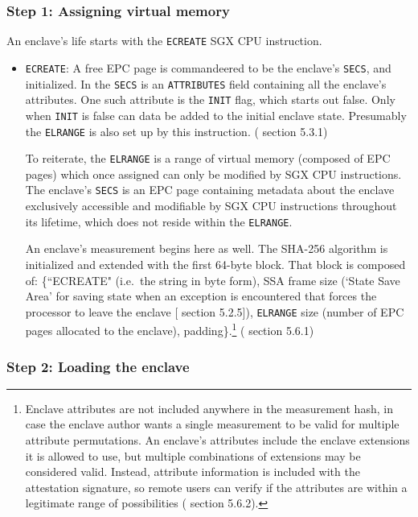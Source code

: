 \subsubsection{Step 1: Assigning virtual memory}

An enclave's life starts with the {\tt ECREATE} SGX CPU instruction.

\begin{itemize}
    \item {\tt ECREATE}: A free EPC page is commandeered to be the enclave's {\tt SECS}, and initialized. In the {\tt SECS} is an {\tt ATTRIBUTES} field containing all the enclave's attributes. One such attribute is the {\tt INIT} flag, which starts out false. Only when {\tt INIT} is false can data be added to the initial enclave state. Presumably the {\tt ELRANGE} is also set up by this instruction. (\cite{intel-sgx-explained-advanced} section 5.3.1)

    To reiterate, the {\tt ELRANGE} is a range of virtual memory (composed of EPC pages) which once assigned can only be modified by SGX CPU instructions. The enclave's {\tt SECS} is an EPC page containing metadata about the enclave exclusively accessible and modifiable by SGX CPU instructions throughout its lifetime, which does not reside within the {\tt ELRANGE}.

    An enclave's measurement begins here as well. The SHA-256 algorithm is initialized and extended with the first 64-byte block. That block is composed of: \{``ECREATE" (i.e.\ the string in byte form), SSA frame size (`State Save Area' for saving state when an exception is encountered that forces the processor to leave the enclave [\cite{intel-sgx-explained-advanced} section 5.2.5]), {\tt ELRANGE} size (number of EPC pages allocated to the enclave), padding\}.\footnote{Enclave attributes are not included anywhere in the measurement hash, in case the enclave author wants a single measurement to be valid for multiple attribute permutations. An enclave's attributes include the enclave extensions it is allowed to use, but multiple combinations of extensions may be considered valid. Instead, attribute information is included with the attestation signature, so remote users can verify if the attributes are within a legitimate range of possibilities (\cite{intel-sgx-explained-advanced} section 5.6.2).} (\cite{intel-sgx-explained-advanced} section 5.6.1)
\end{itemize}

\subsubsection{Step 2: Loading the enclave}

